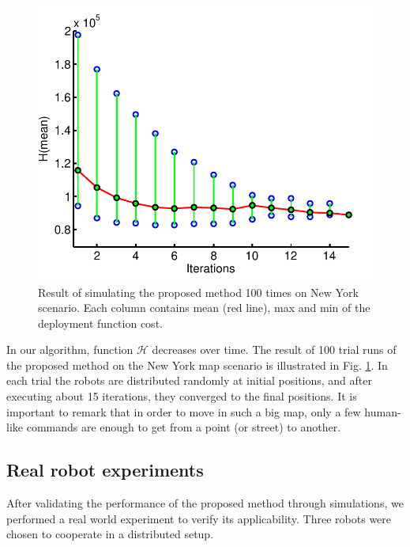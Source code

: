 \documentclass[smallcondensed]{svjour3}
\begin{document}
\begin{figure}
\centering
\includegraphics[width=0.7 \columnwidth]{Figures/Fig14.pdf}
\caption{Result of simulating the proposed method 100 times on New York scenario. Each column contains mean (red line), max and min of the deployment function cost.}
\label{fig:100sim}
\end{figure}

In our algorithm, function $\mathcal{H}$ decreases over time. The result of 100 trial runs of the proposed method on the New York map scenario is illustrated in Fig. \ref{fig:100sim}. In each trial the robots are distributed randomly at initial positions, and after executing about 15 iterations, they converged to the final positions. It is important to remark that in order to move in such a big map, only a few human-like commands are enough to get from a point (or street) to another.

\subsection{Real robot experiments}

After validating the performance of the proposed method through simulations, we performed a real world experiment to verify its applicability. Three robots were chosen to cooperate in a distributed setup. 
\end{document}
